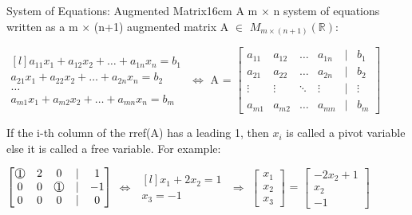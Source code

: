     \begin{definition}{System of Equations: Augmented Matrix}{16cm}
        A m $\times$ n system of equations written as a
        m $\times$ (n+1) {\color{lblue} augmented matrix}
        A $\in$ $M_{m \times (n+1)}(\mathbb{R})$:

        \hspace{0.5cm}
        $\begin{matrix*}[l]
            a_{11}x_1 + a_{12}x_2 + \hdots + a_{1n}x_n = b_1 \\
            a_{21}x_1 + a_{22}x_2 + \hdots + a_{2n}x_n = b_2 \\
            \hdots \\
            a_{m1}x_1 + a_{m2}x_2 + \hdots + a_{mn}x_n = b_m
        \end{matrix*}$
        \hspace{0.5cm}
        $\Leftrightarrow$
        \hspace{0.5cm}
        A = 
        $\begin{bmatrix}
            a_{11} & a_{12} & \hdots & a_{1n} & | & b_1 \\
            a_{21} & a_{22} & \hdots & a_{2n} & | & b_2 \\
            \vdots & \vdots & \ddots & \vdots & | & \vdots \\
            a_{m1} & a_{m2} & \hdots & a_{mn} & | & b_m
        \end{bmatrix}$ 

        If the i-th column of the rref(A) has a leading 1, then $x_i$ is called
        a {\color{lblue} pivot variable} else it is called a
        {\color{lblue} free variable}. For example:

        \hspace{0.5cm}
        $\begin{bmatrix}
            \circnum{1} & 2 & 0 & | & 1 \\
            0 & 0 & \circnum{1} & | & -1 \\
            0 & 0 & 0 & | & 0
        \end{bmatrix}$
        \hspace{0.5cm}
        $\Leftrightarrow$
        \hspace{0.5cm}
        $\begin{matrix*}[l]
            x_1 + 2x_2 = 1 \\
            x_3 = -1
        \end{matrix*}$
        \hspace{0.5cm}
        $\Rightarrow$
        \hspace{0.5cm}
        $\begin{bmatrix}
            x_1 \\
            x_2 \\
            x_3
        \end{bmatrix}$ =
        $\begin{bmatrix}
            -2x_2 + 1 \\
            x_2 \\
            -1
        \end{bmatrix}$


\end{definition}
